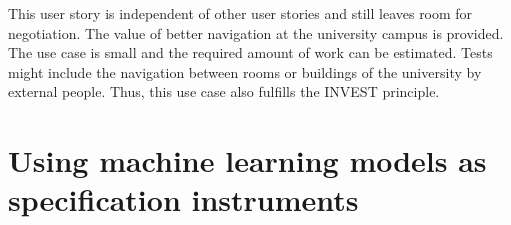 \documentclass[conference,onecolumn]{IEEEtran}
\begin{document}
This user story is independent of other user stories and still leaves room for negotiation. The value of better navigation at the university campus is provided.
The use case is small and the required amount of work can be estimated. Tests might include the navigation between rooms or buildings of the university by external people.
Thus, this use case also fulfills the INVEST principle.

\section{Using machine learning models as specification instruments}

%
%
%
\end{document}
